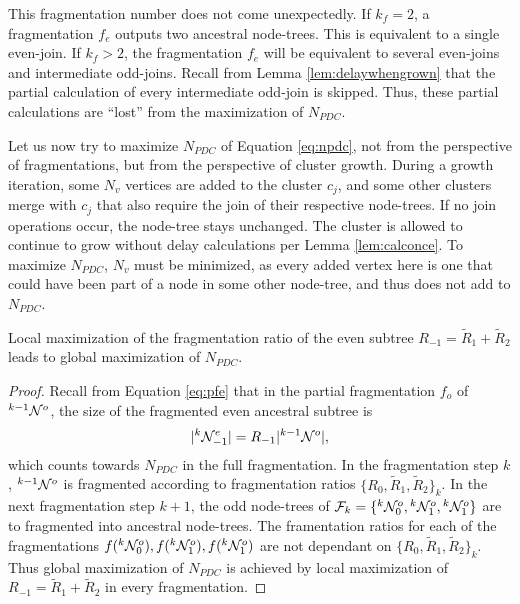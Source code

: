 This fragmentation number does not come unexpectedly. If $k_f=2$, a fragmentation $f_e$ outputs two ancestral node-trees. This is equivalent to a single even-join. If $k_f>2$, the fragmentation $f_e$ will be equivalent to several even-joins and intermediate odd-joins. Recall from Lemma \ref{lem:delaywhengrown} that the partial calculation of every intermediate odd-join is skipped. Thus, these partial calculations are ``lost'' from the maximization of $N_{PDC}$.

Let us now try to maximize $N_{PDC}$ of Equation \eqref{eq:npdc}, not from the perspective of fragmentations, but from the perspective of cluster growth. During a growth iteration, some $N_v$ vertices are added to the cluster $c_j$, and some other clusters merge with $c_j$ that also require the join of their respective node-trees. If no join operations occur, the node-tree stays unchanged. The cluster is allowed to continue to grow without delay calculations per Lemma \ref{lem:calconce}. To maximize $N_{PDC}$, $N_v$ must be minimized, as every added vertex here is one that could have been part of a node in some other node-tree, and thus does not add to $N_{PDC}$.


\begin{lemma}\label{lem:localmax}
  Local maximization of the fragmentation ratio of the even subtree $R_{-1}=\tilde{R}_1+\tilde{R}_2$ leads to global maximization of $N_{PDC}$.
\end{lemma}
\begin{proof}
  Recall from Equation \eqref{eq:pfe} that in the partial fragmentation $f_o$ of ${}^{k-1}\mathcal{N}^o$, the size of the fragmented even ancestral subtree is
  \begin{equation*}
    \lvert{}^{k}\mathcal{N}^e_{-1}\rvert = R_{-1}\lvert{}^{k-1}\mathcal{N}^o\rvert,
  \end{equation*}
  which counts towards $N_{PDC}$ in the full fragmentation. In the fragmentation step $k$, ${}^{k-1}\mathcal{N}^o$ is fragmented according to fragmentation ratios $\{R_0, \tilde{R}_1, \tilde{R}_2\}_k$. In the next fragmentation step $k+1$, the odd node-trees of $\mathcal{F}_k=\{{}^{k}\mathcal{N}^o_0, {}^{k}\mathcal{N}^o_1, {}^{k}\mathcal{N}^o_1\}$ are to fragmented into ancestral node-trees. The framentation ratios for each of the fragmentations $f({}^{k}\mathcal{N}^o_0), f({}^{k}\mathcal{N}^o_1), f({}^{k}\mathcal{N}^o_1)$ are not dependant on $\{R_0, \tilde{R}_1, \tilde{R}_2\}_k$. Thus global maximization of $N_{PDC}$ is achieved by local maximization of $R_{-1}=\tilde{R}_1+\tilde{R}_2$ in every fragmentation.
\end{proof}

